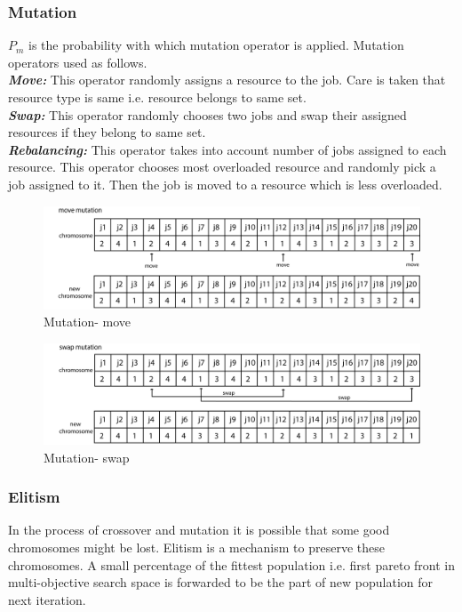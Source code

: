 \subsubsection{Mutation}
$P_m$ is the probability with which mutation operator is applied. Mutation operators used as follows.\\
\textbf{\emph{ Move:}} This operator randomly assigns a resource to the job. Care is taken that resource type is same i.e. resource belongs to same set.\\
\textbf{\emph{ Swap:}} This operator randomly chooses two jobs and swap their assigned resources if they belong to same set.\\
\textbf{\emph{ Rebalancing: }} This operator takes into account number of jobs assigned to each resource. This operator chooses most overloaded resource and randomly pick a job assigned to it. Then the job is moved to a resource which is less overloaded.\\
\begin{figure}[ht]
    \centering
    \includegraphics[width=1.0\columnwidth]{mutation1}
    \caption{Mutation- move}
	\label{movemuta}
\end{figure}
\begin{figure}[h]
    \centering
    \includegraphics[width=1.0\columnwidth]{mutation2}
    \caption{Mutation- swap}
	\label{swapmuta}
\end{figure}
\subsubsection{Elitism}
In the process of crossover and mutation it is possible that some good chromosomes might be lost. Elitism is a mechanism to preserve these chromosomes. A small percentage of the fittest population i.e. first pareto front in multi-objective search space is forwarded to be the part of new population for next iteration.
